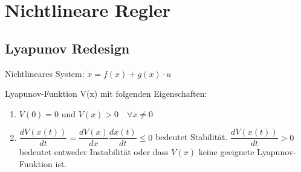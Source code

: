 \section{Nichtlineare Regler}

\subsection{Lyapunov Redesign}

Nichtlineares System: $\dot{x} = f(x) + g(x) \cdot u$

Lyapunov-Funktion V(x) mit folgenden Eigenschaften:
\begin{enumerate}
	\item $V(0) = 0$ und $V(x) > 0 \quad \forall x \neq 0$
	\item $\dfrac{dV(x(t))}{dt}=\dfrac{dV(x)}{dx}\dfrac{dx(t)}{dt} \leq 0$ bedeutet Stabilität. $\dfrac{dV(x(t))}{dt} > 0$ bedeutet entweder Instabilität oder dass $V(x)$ keine geeignete Lyapunov-Funktion ist.
\end{enumerate}